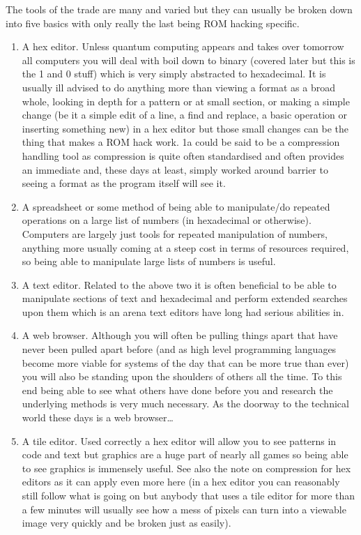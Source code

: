\documentclass[
]{book}
\providecommand{\tightlist}{%
  \setlength{\itemsep}{0pt}\setlength{\parskip}{0pt}}
\begin{document}
The tools of the trade are many and varied but they can usually be broken down into five basics with only really the last being ROM hacking specific.

\begin{enumerate}
\def\labelenumi{\arabic{enumi}.}
\tightlist
\item
  A hex editor. Unless quantum computing appears and takes over tomorrow all computers you will deal with boil down to binary (covered later but this is the 1 and 0 stuff) which is very simply abstracted to hexadecimal. It is usually ill advised to do anything more than viewing a format as a broad whole, looking in depth for a pattern or at small section, or making a simple change (be it a simple edit of a line, a find and replace, a basic operation or inserting something new) in a hex editor but those small changes can be the thing that makes a ROM hack work. 1a could be said to be a compression handling tool as compression is quite often standardised and often provides an immediate and, these days at least, simply worked around barrier to seeing a format as the program itself will see it.
\item
  A spreadsheet or some method of being able to manipulate/do repeated operations on a large list of numbers (in hexadecimal or otherwise). Computers are largely just tools for repeated manipulation of numbers, anything more usually coming at a steep cost in terms of resources required, so being able to manipulate large lists of numbers is useful.
\item
  A text editor. Related to the above two it is often beneficial to be able to manipulate sections of text and hexadecimal and perform extended searches upon them which is an arena text editors have long had serious abilities in.
\item
  A web browser. Although you will often be pulling things apart that have never been pulled apart before (and as high level programming languages become more viable for systems of the day that can be more true than ever) you will also be standing upon the shoulders of others all the time. To this end being able to see what others have done before you and research the underlying methods is very much necessary. As the doorway to the technical world these days is a web browser\ldots{}
\item
  A tile editor. Used correctly a hex editor will allow you to see patterns in code and text but graphics are a huge part of nearly all games so being able to see graphics is immensely useful. See also the note on compression for hex editors as it can apply even more here (in a hex editor you can reasonably still follow what is going on but anybody that uses a tile editor for more than a few minutes will usually see how a mess of pixels can turn into a viewable image very quickly and be broken just as easily).
\end{enumerate}
\end{document}

